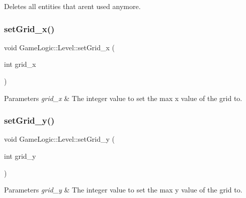 Deletes all entities that aren\textquotesingle{}t used anymore. \mbox{\label{classGameLogic_1_1Level_ac5f2066f82041e2222b79c427055f424}} 
\subsubsection{\texorpdfstring{set\+Grid\+\_\+x()}{setGrid\_x()}}
{\footnotesize\ttfamily void Game\+Logic\+::\+Level\+::set\+Grid\+\_\+x (\begin{DoxyParamCaption}\item[{int}]{grid\+\_\+x }\end{DoxyParamCaption})}


\begin{DoxyParams}{Parameters}
{\em grid\+\_\+x} & The integer value to set the max x value of the grid to. \\
\hline
\end{DoxyParams}
\mbox{\label{classGameLogic_1_1Level_a23edca6119a73f28b7823f1d6c1df2d6}} 
\subsubsection{\texorpdfstring{set\+Grid\+\_\+y()}{setGrid\_y()}}
{\footnotesize\ttfamily void Game\+Logic\+::\+Level\+::set\+Grid\+\_\+y (\begin{DoxyParamCaption}\item[{int}]{grid\+\_\+y }\end{DoxyParamCaption})}


\begin{DoxyParams}{Parameters}
{\em grid\+\_\+y} & The integer value to set the max y value of the grid to. \\
\hline
\end{DoxyParams}
\mbox{\label{classGameLogic_1_1Level_a418ab1b60ad2d35ad5983a0ec596dce6}} 
